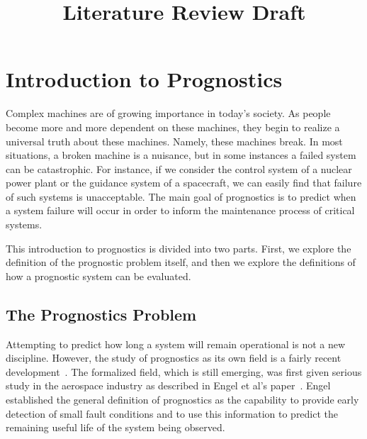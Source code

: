 \documentclass[12pt]{article}
\title{Literature Review Draft}
\begin{document}
\maketitle

\section{Introduction to Prognostics}
Complex machines are of growing importance in today's society.  As people
become more and more dependent on these machines, they begin to realize a
universal truth about these machines.  Namely, these machines break.  In most
situations, a broken machine is a nuisance, but in some instances a failed
system can be catastrophic.  For instance, if we consider the control system of
a nuclear power plant or the guidance system of a spacecraft, we can easily
find that failure of such systems is unacceptable.  The main goal of
prognostics is to predict when a system failure will occur in order to inform
the maintenance process of critical systems.  

This introduction to prognostics is divided into two parts.  First, we explore
the definition of the prognostic problem itself, and then we explore the
definitions of how a prognostic system can be evaluated.

\subsection{The Prognostics Problem}
Attempting to predict how long a system will remain operational is
not a new discipline.  However, the study of prognostics as its own field is a
fairly recent development~\cite{877920}.  The formalized field, which is still
emerging, was first given serious study in the aerospace industry as described
in Engel et al's paper~\cite{877920}.  Engel established the general
definition of prognostics as the capability to provide early detection of small
fault conditions and to use this information to predict the remaining useful
life of the system being observed.  
\end{document}
